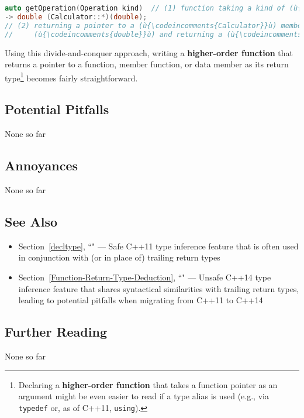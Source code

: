 \begin{lstlisting}[language=C++]
auto getOperation(Operation kind)  // (1) function taking a kind of (ù{\codeincomments{Operation}}ù)
-> double (Calculator::*)(double);
// (2) returning a pointer to a (ù{\codeincomments{Calculator}}ù) member function taking a
//     (ù{\codeincomments{double}}ù) and returning a (ù{\codeincomments{double}}ù)
\end{lstlisting}

\noindent Using this divide-and-conquer approach, writing a \textbf{higher-order function} that returns a
pointer to a function, member function, or data member as its return
type{\cprotect\footnote{Declaring a \textbf{higher-order function} that
takes a function pointer as an argument might be even easier to read
if a type alias is used (e.g., via \texttt{typedef} or, as of C++11,
\texttt{using}).}} becomes fairly straightforward.

\subsection[Potential Pitfalls]{Potential Pitfalls}\label{potential-pitfalls}

None so far

\subsection[Annoyances]{Annoyances}\label{annoyances}

None so far

\subsection[See Also]{See Also}\label{see-also}

\begin{itemize}
\item{Section~\ref{decltype}, ``" — Safe C++11 type inference feature that is often used in conjunction with (or in place of) trailing return types}
\item{Section~\ref{Function-Return-Type-Deduction}, ``" — Unsafe C++14 type inference feature that shares syntactical similarities with trailing return types, leading to potential pitfalls when migrating from C++11 to C++14}
\end{itemize}

\subsection[Further Reading]{Further Reading}\label{further-reading}

None so far


